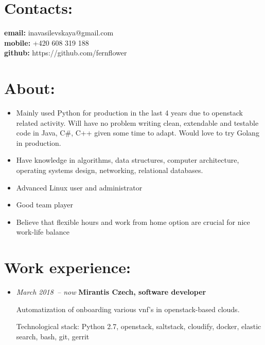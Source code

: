 \documentclass{res}
\begin{document}
    \begin{resume}
        \section{Contacts:}
        {\bf email:} inavasilevskaya@gmail.com \\
        {\bf mobile:} +420 608 319 188\\
        {\bf github:} https://github.com/fernflower\\
        \section{About:}
        \begin{itemize}
            \item Mainly used Python for production in the last 4 years due to openstack related activity. Will have no problem writing clean, extendable and testable code in
                Java, C\#, C++ given some time to adapt. Would love to try Golang in production.

            \item Have knowledge in algorithms, data structures, computer architecture, operating systems design, networking, relational databases.

            \item Advanced Linux user and administrator

            \item Good team player

            \item Believe that flexible hours and work from home option are crucial for nice work-life balance

        \end{itemize}

        \section{Work experience:}
        \begin{itemize}
            \item \textit{March 2018~-- now}
                \textbf{Mirantis Czech, software developer}

                Automatization of onboarding various vnf's in openstack-based clouds.

                Technological stack: Python 2.7, openstack, saltstack, cloudify, docker, elastic search, bash, git, gerrit


\end{itemize}
\end{resume}
\end{document}
